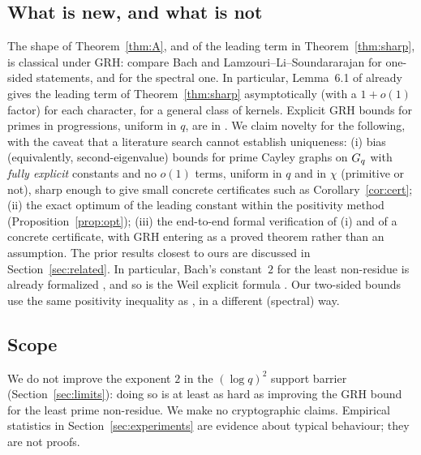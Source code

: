 \subsection{What is new, and what is not}
The shape of Theorem~\ref{thm:A}, and of the leading term in Theorem~\ref{thm:sharp}, is classical
under GRH: compare Bach \cite{bach1990} and Lamzouri--Li--Soundararajan \cite{lls2015} for one-sided
statements, and \cite{jmv2009} for the spectral one. In particular, Lemma~6.1 of \cite{lls2015} already gives the leading term of
Theorem~\ref{thm:sharp} asymptotically (with a $1+o(1)$ factor) for each character, for a general class of kernels. Explicit GRH bounds for
primes in progressions, uniform in $q$, are in \cite{ehp2022}. We claim novelty for the following, with the caveat that a
literature search cannot establish uniqueness:
(i) bias (equivalently, second-eigenvalue) bounds for prime Cayley graphs on $G_q$ with \emph{fully explicit}
constants and no $o(1)$ terms, uniform in $q$ and in $\chi$ (primitive or not), sharp enough to give small concrete certificates
such as Corollary~\ref{cor:cert};
(ii) the exact optimum of the leading constant within the positivity method (Proposition~\ref{prop:opt});
(iii) the end-to-end formal verification of (i) and of a concrete certificate, with GRH entering as a
proved theorem rather than an assumption.
The prior results closest to ours are discussed in Section~\ref{sec:related}. In particular, Bach's
constant~$2$ for the least non-residue is already formalized \cite{grhmiller}, and so is the Weil
explicit formula \cite{zeta23}. Our two-sided bounds use the same positivity inequality as
\cite{grhmiller}, in a different (spectral) way.

\subsection{Scope}
We do not improve the exponent $2$ in the $(\log q)^2$ support barrier (Section~\ref{sec:limits}):
doing so is at least as hard as improving the GRH bound for the least prime non-residue. We make no
cryptographic claims. Empirical statistics in Section~\ref{sec:experiments} are evidence about typical
behaviour; they are not proofs.
